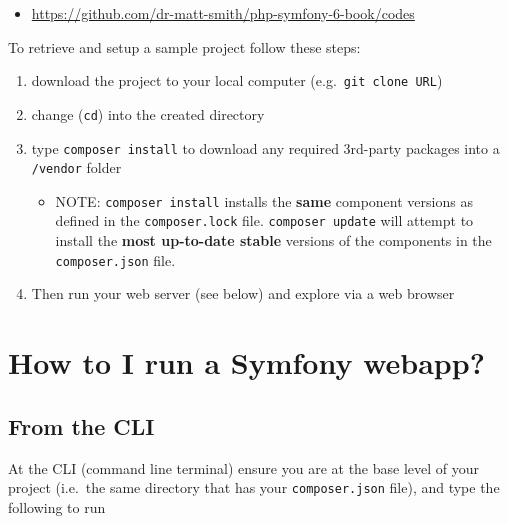 \documentclass[a4paperpaper,openright]{book}
\newenvironment{Shaded}{}{}
\newcommand{\ExtensionTok}[1]{#1}
\newcommand{\NormalTok}[1]{#1}
\providecommand{\tightlist}{%
  \setlength{\itemsep}{0pt}\setlength{\parskip}{0pt}}
\begin{document}
\begin{itemize}
\tightlist
\item
  \url{https://github.com/dr-matt-smith/php-symfony-6-book/codes}
\end{itemize}

To retrieve and setup a sample project follow these steps:

\begin{enumerate}
\def\labelenumi{\arabic{enumi}.}
\item
  download the project to your local computer
  (e.g.~\texttt{git\ clone\ URL})
\item
  change (\texttt{cd}) into the created directory
\item
  type \texttt{composer\ install} to download any required 3rd-party
  packages into a \texttt{/vendor} folder

  \begin{itemize}
  \tightlist
  \item
    NOTE: \texttt{composer\ install} installs the \textbf{same}
    component versions as defined in the \texttt{composer.lock} file.
    \texttt{composer\ update} will attempt to install the \textbf{most
    up-to-date stable} versions of the components in the
    \texttt{composer.json} file.
  \end{itemize}
\item
  Then run your web server (see below) and explore via a web browser
\end{enumerate}

\hypertarget{how-to-i-run-a-symfony-webapp}{%
\section{How to I run a Symfony
webapp?}\label{how-to-i-run-a-symfony-webapp}}

\hypertarget{from-the-cli}{%
\subsection{From the CLI}\label{from-the-cli}}

At the CLI (command line terminal) ensure you are at the base level of
your project (i.e.~the same directory that has your
\texttt{composer.json} file), and type the following to run

\begin{Shaded}
\end{Shaded}
\end{document}
